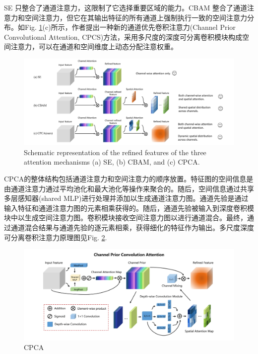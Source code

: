 \documentclass[a4paper]{ctexart}
\begin{document}
	 	SE 只整合了通道注意力，这限制了它选择重要区域的能力。CBAM 整合了通道注意力和空间注意力，但它在其输出特征的所有通道上强制执行一致的空间注意力分布。如Fig. \ref{fig: SE_CBAM_CPCA}(c)所示，作者\cite{huang2023channel}提出一种新的通道优先卷积注意力(Channel Prior Convolutional Attention, CPCS)方法，采用多尺度的深度可分离卷积模块构成空间注意力，可以在通道和空间维度上动态分配注意权重。
	 	
	 	\begin{figure}[htbp]
	 		\centering
	 		\includegraphics[width=0.8\linewidth]{picture/LLIE/Experiment/SE_CBAM_CPCA}
	 		\caption{Schematic representation of the refined features of the three attention mechanisms (a) SE, (b) CBAM, and (c) CPCA.}
	 		\label{fig: SE_CBAM_CPCA}
	 	\end{figure}
		 
		CPCA的整体结构包括通道注意力和空间注意力的顺序放置。特征图的空间信息是由通道注意力通过平均池化和最大池化等操作来聚合的。随后，空间信息通过共享多层感知器(shared MLP)进行处理并添加以生成通道注意力图。通道先验是通过输入特征和通道注意力图的元素相乘获得的。随后，通道先验被输入到深度卷积模块中以生成空间注意力图。卷积模块接收空间注意力图以进行通道混合。最终，通过通道混合结果与通道先验的逐元素相乘，获得细化的特征作为输出。多尺度深度可分离卷积注意力原理图见Fig. \ref{fig: CPCA}.
		
		\begin{figure}[htbp]
			\centering
			\includegraphics[width=0.8\linewidth]{picture/LLIE/Experiment/CPCA}
			\caption{CPCA}
			\label{fig: CPCA}
		\end{figure}
		
\end{document}
